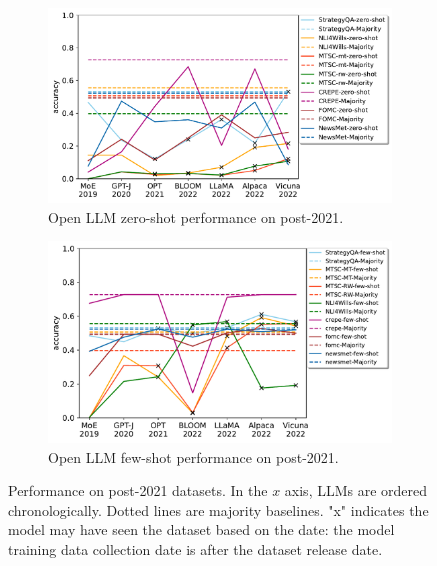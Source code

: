 \documentclass[letterpaper]{article} %
\begin{document}
\begin{figure}[b]
\begin{subfigure}[b]{0.45\textwidth}
            \includegraphics[scale=0.38]{img/output-zero-shot-new-dataset-recent-llm.pdf}
            \caption[]%
            {Open LLM zero-shot performance on post-2021.}
            \label{fig:Zero shot performance for new datasets}
        \end{subfigure}
        \hfill
        \begin{subfigure}[b]{0.45\textwidth}
            \centering
            \includegraphics[scale=0.38]{img/output-few-shot-new-dataset-recent-llm.pdf}
            \caption[]%
            {Open LLM few-shot performance on post-2021.}
            \label{fig:Few shot performance for new datasets}
        \end{subfigure}
        \caption[]
        {Performance on post-2021 datasets. In the $x$ axis, LLMs are ordered chronologically. Dotted lines are majority baselines. "x" indicates the model may have seen the dataset based on the date: the model training data collection date is after the dataset release date.}
        \label{fig:experiments-few-shot}
    \end{figure}
\end{document}

